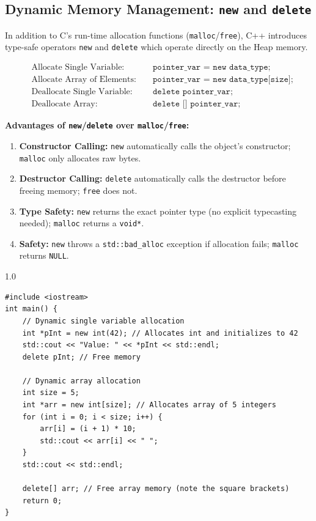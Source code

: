 \documentclass[12pt,a4paper]{article}
\begin{document}
\subsection{Dynamic Memory Management: \texorpdfstring{\texttt{new}}{new} and \texorpdfstring{\texttt{delete}}{delete}}
In addition to C's run-time allocation functions (\texttt{malloc}/\texttt{free}), C++ introduces type-safe operators \texttt{new} and \texttt{delete} which operate directly on the Heap memory.

\begin{tcolorbox}[formulabox, title={\textbf{Dynamic Memory Syntax}}]
\begin{align}
  &\text{Allocate Single Variable: } && \texttt{pointer\_var = new data\_type;} \\
  &\text{Allocate Array of Elements: } && \texttt{pointer\_var = new data\_type[size];} \\
  &\text{Deallocate Single Variable: } && \texttt{delete pointer\_var;} \\
  &\text{Deallocate Array: } && \texttt{delete [] pointer\_var;}
\end{align}
\end{tcolorbox}

\textbf{Advantages of \texttt{new}/\texttt{delete} over \texttt{malloc}/\texttt{free}:}
\begin{enumerate}[label=\textbf{\arabic*.}, leftmargin=*, itemsep=2pt]
  \item \textbf{Constructor Calling:} \texttt{new} automatically calls the object's constructor; \texttt{malloc} only allocates raw bytes.
  \item \textbf{Destructor Calling:} \texttt{delete} automatically calls the destructor before freeing memory; \texttt{free} does not.
  \item \textbf{Type Safety:} \texttt{new} returns the exact pointer type (no explicit typecasting needed); \texttt{malloc} returns a \texttt{void*}.
  \item \textbf{Safety:} \texttt{new} throws a \texttt{std::bad\_alloc} exception if allocation fails; \texttt{malloc} returns \texttt{NULL}.
\end{enumerate}

\begin{tcolorbox}[examplebox, title={Code Example: Dynamic allocation of variable and array}]
\begin{spacing}{1.0}
\begin{verbatim}
#include <iostream>
int main() {
    // Dynamic single variable allocation
    int *pInt = new int(42); // Allocates int and initializes to 42
    std::cout << "Value: " << *pInt << std::endl;
    delete pInt; // Free memory

    // Dynamic array allocation
    int size = 5;
    int *arr = new int[size]; // Allocates array of 5 integers
    for (int i = 0; i < size; i++) {
        arr[i] = (i + 1) * 10;
        std::cout << arr[i] << " ";
    }
    std::cout << std::endl;
    
    delete[] arr; // Free array memory (note the square brackets)
    return 0;
}
\end{verbatim}
\end{spacing}
\end{tcolorbox}
\end{document}
